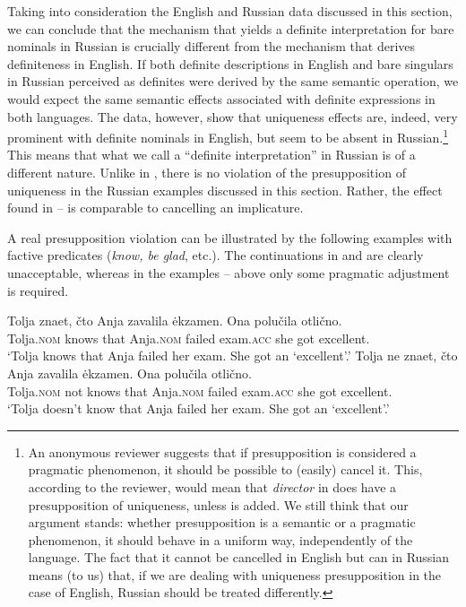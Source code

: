 \documentclass[output=paper,
colorlinks,
citecolor=brown,
newtxmath
]{langscibook}
\begin{document}
\noindent Taking into consideration the English and Russian data discussed in this section, we can conclude
that the mechanism that yields a definite interpretation for bare nominals in Russian is crucially different from the mechanism that derives definiteness in English. If both definite descriptions in English and bare singulars in Russian perceived as definites were derived by the same semantic operation, we would expect the same semantic effects associated with definite expressions in both languages. The data, however, show that uniqueness effects are, indeed, very prominent with definite nominals in English, but seem to be absent in Russian.\footnote{An anonymous reviewer suggests that if presupposition is considered a pragmatic phenomenon, it should be possible to (easily) cancel it. This, according to the reviewer, would mean that \textit{director} in  does have a presupposition of uniqueness, unless  is added. We still think that our argument stands: whether presupposition is a semantic or a pragmatic phenomenon, it should behave in a uniform way, independently of the language. The fact that it cannot be cancelled in English but can in Russian means (to us) that, if we are dealing with uniqueness presupposition in the case of English, Russian should be treated differently.} This means
that what we call a ``definite interpretation'' in Russian is of a different nature. Unlike %
in , there is no violation of the presupposition of uniqueness in the Russian examples discussed in this section.
Rather, the effect found in -- is comparable to cancelling an implicature.

A real presupposition violation can be illustrated by the following examples with factive predicates (\textit{know, be glad}, etc.). The continuations in  and  are clearly unacceptable, whereas in the examples -- above only some pragmatic adjustment is required. %

\ea \label{ex:i}
\gll Tolja		znaet,	čto		Anja		zavalila	ėkzamen.	\minsp{\#} Ona	polučila 	otlično. \\
Tolja.\textsc{nom} knows that 	Anja.\textsc{nom}	failed 		exam.\textsc{acc}  {} she 	got 		excellent.\\
\glt `Tolja knows that Anja failed her exam. She got an `excellent'.'
\z
\ea \label{ex:ii}
\gll Tolja		ne		znaet, čto 		Anja 		zavalila	ėkzamen. \minsp{\#} Ona	polučila	otlično. \\
Tolja.\textsc{nom}  not	knows that 	Anja.\textsc{nom}	failed 		exam.\textsc{acc} {} she	got 		excellent.\\
\glt `Tolja doesn't know that Anja failed her exam. She got an `excellent'.'
\z
\end{document}
